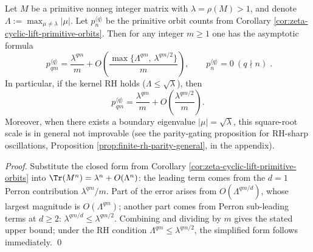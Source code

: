 \begin{proposition}\label{prop:zeta-cyclic-lift-prime-shadow-asymptotic}
Let \(M\) be a primitive nonneg integer matrix with \(\lambda=\rho(M)>1\), and denote
\(
\Lambda:=\max_{\mu\neq\lambda}|\mu|
\).
Let \(p_n^{\langle q\rangle}\) be the primitive orbit counts from Corollary \ref{cor:zeta-cyclic-lift-primitive-orbits}.
Then for any integer \(m\ge 1\) one has the asymptotic formula
\[
\boxed{\;
p_{qm}^{\langle q\rangle}
=\frac{\lambda^{qm}}{m}
+O\!\left(\frac{\max\{\Lambda^{qm},\,\lambda^{qm/2}\}}{m}\right),\qquad
p_n^{\langle q\rangle}=0\ (q\nmid n)\; }.
\]
In particular, if the kernel RH holds (\(\Lambda\le\sqrt{\lambda}\)), then
\[
\boxed{\;
p_{qm}^{\langle q\rangle}
=\frac{\lambda^{qm}}{m}
+O\!\left(\frac{\lambda^{qm/2}}{m}\right).\;}
\]
Moreover, when there exists a boundary eigenvalue \(|\mu|=\sqrt{\lambda}\), this square-root scale is in general not improvable (see the parity-gating proposition for RH-sharp oscillations, Proposition \ref{prop:finite-rh-parity-general}, in the appendix).
\end{proposition}
\begin{proof}
Substitute the closed form from Corollary \ref{cor:zeta-cyclic-lift-primitive-orbits} into
\(
\Tr(M^n)=\lambda^n+O(\Lambda^n)
\):
the leading term comes from the \(d=1\) Perron contribution \(\lambda^{qm}/m\).
Part of the error arises from \(O(\Lambda^{qm/d})\), whose largest magnitude is \(O(\Lambda^{qm})\);
another part comes from Perron sub-leading terms at \(d\ge 2\): \(\lambda^{qm/d}\le \lambda^{qm/2}\).
Combining and dividing by \(m\) gives the stated upper bound; under the RH condition \(\Lambda^{qm}\le \lambda^{qm/2}\), the simplified form follows immediately. \qed
\end{proof}

